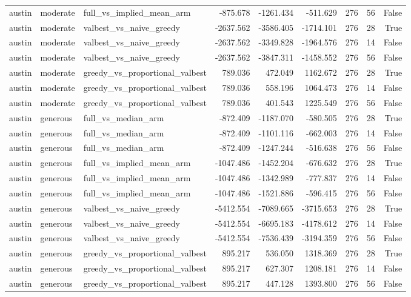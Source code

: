 \begin{tabular}{lllrrrrrr}
austin & moderate & full\_vs\_implied\_mean\_arm & -875.678 & -1261.434 & -511.629 & 276 & 56 & False \\
austin & moderate & valbest\_vs\_naive\_greedy & -2637.562 & -3586.405 & -1714.101 & 276 & 28 & True \\
austin & moderate & valbest\_vs\_naive\_greedy & -2637.562 & -3349.828 & -1964.576 & 276 & 14 & False \\
austin & moderate & valbest\_vs\_naive\_greedy & -2637.562 & -3847.311 & -1458.552 & 276 & 56 & False \\
austin & moderate & greedy\_vs\_proportional\_valbest & 789.036 & 472.049 & 1162.672 & 276 & 28 & True \\
austin & moderate & greedy\_vs\_proportional\_valbest & 789.036 & 558.196 & 1064.473 & 276 & 14 & False \\
austin & moderate & greedy\_vs\_proportional\_valbest & 789.036 & 401.543 & 1225.549 & 276 & 56 & False \\
austin & generous & full\_vs\_median\_arm & -872.409 & -1187.070 & -580.505 & 276 & 28 & True \\
austin & generous & full\_vs\_median\_arm & -872.409 & -1101.116 & -662.003 & 276 & 14 & False \\
austin & generous & full\_vs\_median\_arm & -872.409 & -1247.244 & -516.638 & 276 & 56 & False \\
austin & generous & full\_vs\_implied\_mean\_arm & -1047.486 & -1452.204 & -676.632 & 276 & 28 & True \\
austin & generous & full\_vs\_implied\_mean\_arm & -1047.486 & -1342.989 & -777.837 & 276 & 14 & False \\
austin & generous & full\_vs\_implied\_mean\_arm & -1047.486 & -1521.886 & -596.415 & 276 & 56 & False \\
austin & generous & valbest\_vs\_naive\_greedy & -5412.554 & -7089.665 & -3715.653 & 276 & 28 & True \\
austin & generous & valbest\_vs\_naive\_greedy & -5412.554 & -6695.183 & -4178.612 & 276 & 14 & False \\
austin & generous & valbest\_vs\_naive\_greedy & -5412.554 & -7536.439 & -3194.359 & 276 & 56 & False \\
austin & generous & greedy\_vs\_proportional\_valbest & 895.217 & 536.050 & 1318.369 & 276 & 28 & True \\
austin & generous & greedy\_vs\_proportional\_valbest & 895.217 & 627.307 & 1208.181 & 276 & 14 & False \\
austin & generous & greedy\_vs\_proportional\_valbest & 895.217 & 447.128 & 1393.800 & 276 & 56 & False \\

\end{tabular}
